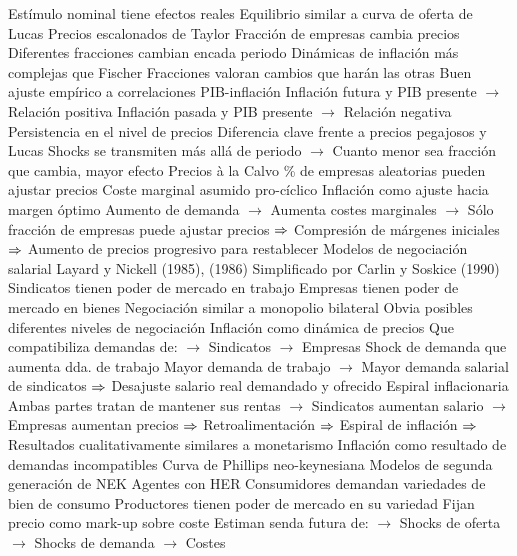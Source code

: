\documentclass{nuevotema}
\begin{document}
\begin{esquemal}
				\4 Estímulo nominal tiene efectos reales
				\4[] Equilibrio similar a curva de oferta de Lucas
			\3 Precios escalonados de Taylor
				\4 Fracción de empresas cambia precios
				\4[] Diferentes fracciones cambian encada periodo
				\4 Dinámicas de inflación más complejas que Fischer
				\4[] Fracciones valoran cambios que harán las otras
				\4 Buen ajuste empírico a correlaciones PIB-inflación
				\4[] Inflación futura y PIB presente
				\4[] $\to$ Relación positiva
				\4[] Inflación pasada y PIB presente
				\4[] $\to$ Relación negativa
				\4 Persistencia en el nivel de precios
				\4[] Diferencia clave frente a precios pegajosos y Lucas
				\4[] Shocks se transmiten más allá de periodo
				\4[] $\to$ Cuanto menor sea fracción que cambia, mayor efecto
			\3 Precios à la Calvo
				\4 \% de empresas aleatorias pueden ajustar precios
				\4 Coste marginal asumido pro-cíclico
				\4 Inflación como ajuste hacia margen óptimo
				\4[] Aumento de demanda
				\4[] $\to$ Aumenta costes marginales
				\4[] $\to$ Sólo fracción de empresas puede ajustar precios
				\4[] $\then$ Compresión de márgenes iniciales
				\4[] $\then$ Aumento de precios progresivo para restablecer
			\3 Modelos de negociación salarial
				\4 Layard y Nickell (1985), (1986)
				\4[] Simplificado por Carlin y Soskice (1990)
				\4 Sindicatos tienen poder de mercado en trabajo
				\4 Empresas tienen poder de mercado en bienes
				\4 Negociación similar a monopolio bilateral
				\4[] Obvia posibles diferentes niveles de negociación
				\4 Inflación como dinámica de precios
				\4[] Que compatibiliza demandas de:
				\4[] $\to$ Sindicatos
				\4[] $\to$ Empresas
				\4 Shock de demanda que aumenta dda. de trabajo
				\4[] Mayor demanda de trabajo
				\4[] $\to$ Mayor demanda salarial de sindicatos
				\4[] $\then$ Desajuste salario real demandado y ofrecido
				\4 Espiral inflacionaria
				\4[] Ambas partes tratan de mantener sus rentas
				\4[] $\to$ Sindicatos aumentan salario
				\4[] $\to$ Empresas aumentan precios
				\4[] $\then$ Retroalimentación
				\4[] $\then$ Espiral de inflación
				\4[] $\then$ Resultados cualitativamente similares a monetarismo
				\4[$\then$] Inflación como resultado de demandas incompatibles
			\3 Curva de Phillips neo-keynesiana
				\4 Modelos de segunda generación de NEK
				\4 Agentes con HER
				\4 Consumidores demandan variedades de bien de consumo
				\4 Productores tienen poder de mercado en su variedad
				\4[] Fijan precio como mark-up sobre coste
				\4 Estiman senda futura de:
				\4[] $\to$ Shocks de oferta
				\4[] $\to$ Shocks de demanda
				\4[] $\to$ Costes

\end{esquemal}
\end{document}
